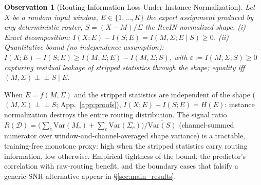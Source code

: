 \documentclass{article}
\newtheorem{observation}{Observation}
\begin{document}
\begin{observation}[Routing Information Loss Under Instance Normalization]\label{obs:routing_loss}
Let $X$ be a random input window, $E \in \{1,\ldots,K\}$ the expert assignment produced by any deterministic router, $S = (X - M)/\Sigma$ the RevIN-normalized shape. \emph{(i) Exact decomposition:} $I(X;E) - I(S;E) = I(M,\Sigma;E\mid S) \geq 0$. \emph{(ii) Quantitative bound (no independence assumption):} $I(X;E) - I(S;E) \geq I(M,\Sigma;E) - I(M,\Sigma;S)$, with $\varepsilon := I(M,\Sigma;S) \geq 0$ capturing residual leakage of stripped statistics through the shape; equality iff $(M,\Sigma) \perp\!\!\!\perp S \mid E$.
\end{observation}

When $E=f(M,\Sigma)$ and the stripped statistics are independent of the shape ($(M,\Sigma)\perp\!\!\!\perp S$; App.~\ref{app:proofs}), $I(X;E){-}I(S;E){=}H(E)$: instance normalization destroys the entire routing distribution. The signal ratio $R(\mathcal{D}) = \bigl(\sum_c\mathrm{Var}(M_c){+}\sum_c\mathrm{Var}(\Sigma_c)\bigr)/\overline{\mathrm{Var}(S)}$ (channel-summed numerator over window-and-channel-averaged shape variance) is a tractable, training-free monotone proxy: high when the stripped statistics carry routing information, low otherwise. Empirical tightness of the bound, the predictor's correlation with raw-routing benefit, and the boundary cases that falsify a generic-SNR alternative appear in \S\ref{sec:main_results}.
\end{document}
